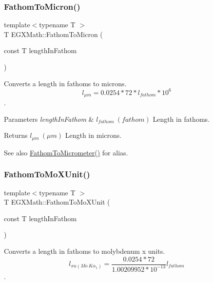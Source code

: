 \subsubsection{\texorpdfstring{Fathom\+To\+Micron()}{FathomToMicron()}}
{\footnotesize\ttfamily template$<$typename T $>$ \\
T E\+G\+X\+Math\+::\+Fathom\+To\+Micron (\begin{DoxyParamCaption}\item[{const T}]{length\+In\+Fathom }\end{DoxyParamCaption})}



Converts a length in fathoms to microns. \[ l_{\mu m}=0.0254 * 72 * l_{fathom} * 10^{6} \]. 


\begin{DoxyParams}{Parameters}
{\em length\+In\+Fathom} & $ l_{fathom}\ (fathom)$ Length in fathoms. \\
\hline
\end{DoxyParams}
\begin{DoxyReturn}{Returns}
$ l_{\mu m}\ (\mu m)$ Length in microns. 
\end{DoxyReturn}
\begin{DoxySeeAlso}{See also}
\mbox{\hyperlink{group___e_g_x_math-_conversions-_length_conversions-_nautical-_fathom-_s_i_gabc04c2f094545c3ae8d4e493e4af417e}{Fathom\+To\+Micrometer()}} for alias. 
\end{DoxySeeAlso}
\mbox{\label{group___e_g_x_math-_conversions-_length_conversions-_nautical-_fathom-_non-_s_i_ga1e69cf778d1b7f72cd015b6cc81fc71c}} 
\subsubsection{\texorpdfstring{Fathom\+To\+Mo\+X\+Unit()}{FathomToMoXUnit()}}
{\footnotesize\ttfamily template$<$typename T $>$ \\
T E\+G\+X\+Math\+::\+Fathom\+To\+Mo\+X\+Unit (\begin{DoxyParamCaption}\item[{const T}]{length\+In\+Fathom }\end{DoxyParamCaption})}



Converts a length in fathoms to molybdenum x units. \[ l_{xu(Mo\ K\alpha_1)}=\frac{0.0254 * 72}{1.00209952*10^{-13}} l_{fathom}\]. 


